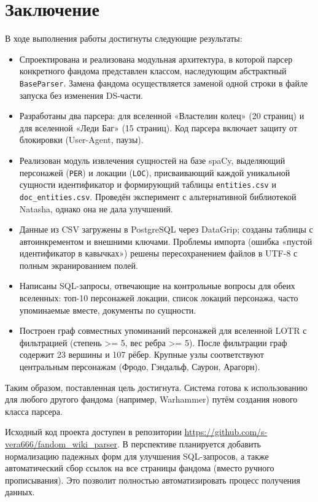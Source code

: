 \section{Заключение}

В ходе выполнения работы достигнуты следующие результаты:
\begin{itemize}
    \item Спроектирована и реализована модульная архитектура, в которой парсер конкретного фандома представлен классом, наследующим абстрактный \texttt{BaseParser}. Замена фандома осуществляется заменой одной строки в файле запуска без изменения DS-части.
    \item Разработаны два парсера: для вселенной «Властелин колец» (20 страниц) и для вселенной «Леди Баг» (15 страниц). Код парсера включает защиту от блокировки (User-Agent, паузы).
    \item Реализован модуль извлечения сущностей на базе spaCy, выделяющий персонажей (\texttt{PER}) и локации (\texttt{LOC}), присваивающий каждой уникальной сущности идентификатор и формирующий таблицы \texttt{entities.csv} и \texttt{doc\_entities.csv}. Проведён эксперимент с альтернативной библиотекой Natasha, однако она не дала улучшений.
    \item Данные из CSV загружены в PostgreSQL через DataGrip; созданы таблицы с автоинкрементом и внешними ключами. Проблемы импорта (ошибка «пустой идентификатор в кавычках») решены пересохранением файлов в UTF-8 с полным экранированием полей.
    \item Написаны SQL-запросы, отвечающие на контрольные вопросы для обеих вселенных: топ-10 персонажей локации, список локаций персонажа, часто упоминаемые вместе, документы по сущности.
    \item Построен граф совместных упоминаний персонажей для вселенной LOTR с фильтрацией (степень >= 5, вес ребра >= 5). После фильтрации граф содержит 23 вершины и 107 рёбер. Крупные узлы соответствуют центральным персонажам (Фродо, Гэндальф, Саурон, Арагорн).
\end{itemize}

Таким образом, поставленная цель достигнута. Система готова к использованию для любого другого фандома (например, Warhammer) путём создания нового класса парсера.

Исходный код проекта доступен в репозитории \url{https://github.com/s-vera666/fandom_wiki_parser}. В перспективе планируется добавить нормализацию падежных форм для улучшения SQL-запросов, а также автоматический сбор ссылок на все страницы фандома (вместо ручного прописывания). Это позволит полностью автоматизировать процесс получения данных.